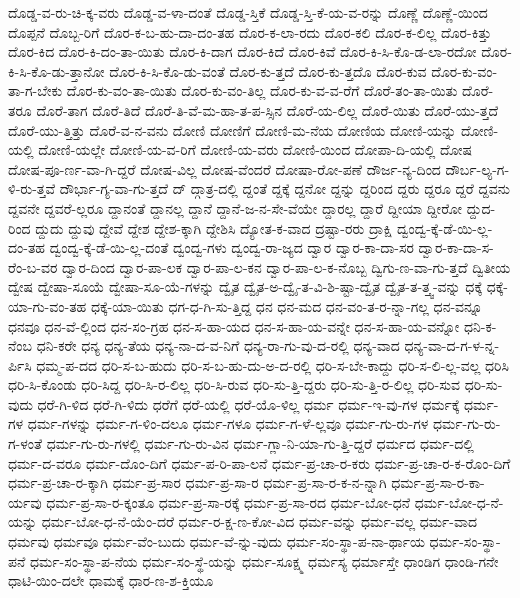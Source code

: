 {ದೊಡ್ಡ-ವ-ರು-ಚಿ-ಕ್ಕ-ವರು
ದೊಡ್ಡ-ವ-ಳಾ-ದಂತೆ
ದೊಡ್ಡ-ಸ್ತಿಕೆ
ದೊಡ್ಡ-ಸ್ತಿ-ಕೆ-ಯ-ವ-ರನ್ನು
ದೊಣ್ಣೆ
ದೊಣ್ಣೆ-ಯಿಂದ
ದೊಪ್ಪನೆ
ದೊಬ್ಬ-ರಿಗೆ
ದೊರ-ಕ-ಬ-ಹು-ದಾ-ದಂ-ತಹ
ದೊರ-ಕ-ಲಾ-ರದು
ದೊರ-ಕಲಿ
ದೊರ-ಕ-ಲಿಲ್ಲ
ದೊರ-ಕಿತ್ತು
ದೊರ-ಕಿದ
ದೊರ-ಕಿ-ದಂ-ತಾ-ಯಿತು
ದೊರ-ಕಿ-ದಾಗ
ದೊರ-ಕಿದೆ
ದೊರ-ಕಿವೆ
ದೊರ-ಕಿ-ಸಿ-ಕೊ-ಡ-ಲಾ-ರದೋ
ದೊರ-ಕಿ-ಸಿ-ಕೊ-ಡು-ತ್ತಾನೋ
ದೊರ-ಕಿ-ಸಿ-ಕೊ-ಡು-ವಂತೆ
ದೊರ-ಕು-ತ್ತದೆ
ದೊರ-ಕು-ತ್ತದೊ
ದೊರ-ಕುವ
ದೊರ-ಕು-ವಂ-ತಾ-ಗ-ಬೇಕು
ದೊರ-ಕು-ವಂ-ತಾ-ಯಿತು
ದೊರ-ಕು-ವಂ-ತಿಲ್ಲ
ದೊರ-ಕು-ವ-ವ-ರೆಗೆ
ದೊರೆ-ತಂ-ತಾ-ಯಿತು
ದೊರೆ-ತರೂ
ದೊರೆ-ತಾಗ
ದೊರೆ-ತಿದೆ
ದೊರೆ-ತಿ-ವೆ-ಮ-ಹಾ-ತ-ಪ-ಸ್ಸಿನ
ದೊರೆ-ಯ-ಲಿಲ್ಲ
ದೊರೆ-ಯಿತು
ದೊರೆ-ಯು-ತ್ತದೆ
ದೊರೆ-ಯು-ತ್ತಿತ್ತು
ದೊರೆ-ವ-ನ-ವನು
ದೋಣಿ
ದೋಣಿಗೆ
ದೋಣಿ-ಮ-ನೆಯ
ದೋಣಿಯ
ದೋಣಿ-ಯನ್ನು
ದೋಣಿ-ಯಲ್ಲಿ
ದೋಣಿ-ಯಲ್ಲೇ
ದೋಣಿ-ಯ-ವ-ರಿಗೆ
ದೋಣಿ-ಯ-ವರು
ದೋಣಿ-ಯಿಂದ
ದೋಪಾ-ದಿ-ಯಲ್ಲಿ
ದೋಷ
ದೋಷ-ಪೂ-ರ್ಣ-ವಾ-ಗಿ-ದ್ದರೆ
ದೋಷ-ವಿಲ್ಲ
ದೋಷ-ವೆಂದರೆ
ದೋಷಾ-ರೋ-ಪಣೆ
ದೌರ್ಜ-ನ್ಯ-ದಿಂದ
ದೌರ್ಬ-ಲ್ಯ-ಗ-ಳಿ-ರು-ತ್ತವೆ
ದೌರ್ಭಾ-ಗ್ಯ-ವಾ-ಗು-ತ್ತದೆ
ದ್
ದ್ಗಾತ್ರ-ದಲ್ಲಿ
ದ್ದಂತೆ
ದ್ದಕ್ಕೆ
ದ್ದನೋ
ದ್ದನ್ನು
ದ್ದರಿಂದ
ದ್ದರು
ದ್ದರೂ
ದ್ದರೆ
ದ್ದವನು
ದ್ದವನೇ
ದ್ದವರೆ-ಲ್ಲರೂ
ದ್ದಾನಂತೆ
ದ್ದಾನಲ್ಲ
ದ್ದಾನೆ
ದ್ದಾನೆ-ಜ-ನ-ಸೇ-ವೆಯೇ
ದ್ದಾರಲ್ಲ
ದ್ದಾರೆ
ದ್ದೀಯಾ
ದ್ದೀರೋ
ದ್ದುದ-ರಿಂದ
ದ್ದುದು
ದ್ದುವು
ದ್ದೇವೆ
ದ್ದೇಶ
ದ್ದೇಶ-ಕ್ಕಾಗಿ
ದ್ದೇಶಿಸಿ
ದ್ಯೋತ-ಕ-ವಾದ
ದ್ರಷ್ಟಾ-ರರು
ದ್ರಾಕ್ಷಿ
ದ್ವಂದ್ವ-ಕ್ಕೆ-ಡೆ-ಯಿ-ಲ್ಲ-ದಂ-ತಹ
ದ್ವಂದ್ವ-ಕ್ಕೆ-ಡೆ-ಯಿ-ಲ್ಲ-ದಂತೆ
ದ್ವಂದ್ವ-ಗಳು
ದ್ವಂದ್ವ-ರಾ-ಜ್ಯದ
ದ್ವಾರ
ದ್ವಾರ-ಕಾ-ದಾ-ಸರ
ದ್ವಾರ-ಕಾ-ದಾ-ಸ-ರೆಂ-ಬ-ವರ
ದ್ವಾರ-ದಿಂದ
ದ್ವಾರ-ಪಾ-ಲಕ
ದ್ವಾರ-ಪಾ-ಲ-ಕನ
ದ್ವಾರ-ಪಾ-ಲ-ಕ-ನೊಬ್ಬ
ದ್ವಿಗು-ಣ-ವಾ-ಗು-ತ್ತದೆ
ದ್ವಿತೀಯ
ದ್ವೇಷ
ದ್ವೇಷಾ-ಸೂಯೆ
ದ್ವೇಷಾ-ಸೂ-ಯೆ-ಗಳನ್ನು
ದ್ವೈತ
ದ್ವೈತ-ಅ-ದ್ವೈ-ತ-ವಿ-ಶಿ-ಷ್ಟಾ-ದ್ವೈತ
ದ್ವೈತ-ತ-ತ್ತ್ವ-ವನ್ನು
ಧಕ್ಕೆ
ಧಕ್ಕೆ-ಯಾ-ಗು-ವಂ-ತಹ
ಧಕ್ಕೆ-ಯಾ-ಯಿತು
ಧಗ-ಧ-ಗಿ-ಸು-ತ್ತಿದ್ದ
ಧನ
ಧನ-ಮದ
ಧನ-ವಂ-ತ-ರ-ನ್ನಾ-ಗಲ್ಲ
ಧನ-ವನ್ನೂ
ಧನವೂ
ಧನ-ವೆ-ಲ್ಲಿಂದ
ಧನ-ಸಂ-ಗ್ರಹ
ಧನ-ಸ-ಹಾ-ಯದ
ಧನ-ಸ-ಹಾ-ಯ-ವನ್ನೇ
ಧನ-ಸ-ಹಾ-ಯ-ವನ್ನೋ
ಧನಿ-ಕ-ನೆಂಬ
ಧನಿ-ಕರೇ
ಧನ್ಯ
ಧನ್ಯ-ತೆಯ
ಧನ್ಯ-ನಾ-ದ-ವ-ನಿಗೆ
ಧನ್ಯ-ರಾ-ಗು-ವು-ದ-ರಲ್ಲಿ
ಧನ್ಯ-ವಾದ
ಧನ್ಯ-ವಾ-ದ-ಗ-ಳ-ನ್ನ-ರ್ಪಿಸಿ
ಧಮ್ಮ-ಪ-ದದ
ಧರಿ-ಸ-ಬ-ಹುದು
ಧರಿ-ಸ-ಬ-ಹು-ದು-ಅ-ದ-ರಲ್ಲಿ
ಧರಿ-ಸ-ಬೇ-ಕಾದ್ದು
ಧರಿ-ಸ-ಲಿ-ಲ್ಲ-ವಲ್ಲ
ಧರಿಸಿ
ಧರಿ-ಸಿ-ಕೊಂಡು
ಧರಿ-ಸಿದ್ದ
ಧರಿ-ಸಿ-ರ-ಲಿಲ್ಲ
ಧರಿ-ಸಿ-ರುವ
ಧರಿ-ಸು-ತ್ತಿ-ದ್ದರು
ಧರಿ-ಸು-ತ್ತಿ-ರ-ಲಿಲ್ಲ
ಧರಿ-ಸುವ
ಧರಿ-ಸು-ವುದು
ಧರೆ-ಗಿ-ಳಿದ
ಧರೆ-ಗಿ-ಳಿದು
ಧರೆಗೆ
ಧರೆ-ಯಲ್ಲಿ
ಧರೆ-ಯೊ-ಳಿಲ್ಲ
ಧರ್ಮ
ಧರ್ಮ-ಇ-ವು-ಗಳ
ಧರ್ಮಕ್ಕೆ
ಧರ್ಮ-ಗಳ
ಧರ್ಮ-ಗಳನ್ನು
ಧರ್ಮ-ಗ-ಳಿಂ-ದಲೂ
ಧರ್ಮ-ಗಳೂ
ಧರ್ಮ-ಗ-ಳೆ-ಲ್ಲವೂ
ಧರ್ಮ-ಗು-ರು-ಗಳ
ಧರ್ಮ-ಗು-ರು-ಗ-ಳಂತೆ
ಧರ್ಮ-ಗು-ರು-ಗಳಲ್ಲಿ
ಧರ್ಮ-ಗು-ರು-ವಿನ
ಧರ್ಮ-ಗ್ಲಾ-ನಿ-ಯಾ-ಗು-ತ್ತಿ-ದ್ದರೆ
ಧರ್ಮದ
ಧರ್ಮ-ದಲ್ಲಿ
ಧರ್ಮ-ದ-ವರೂ
ಧರ್ಮ-ದೊಂ-ದಿಗೆ
ಧರ್ಮ-ಪ-ರಿ-ಪಾ-ಲನೆ
ಧರ್ಮ-ಪ್ರ-ಚಾ-ರ-ಕರು
ಧರ್ಮ-ಪ್ರ-ಚಾ-ರ-ಕ-ರೊಂ-ದಿಗೆ
ಧರ್ಮ-ಪ್ರ-ಚಾ-ರ-ಕ್ಕಾಗಿ
ಧರ್ಮ-ಪ್ರ-ಸಾರ
ಧರ್ಮ-ಪ್ರ-ಸಾ-ರ
ಧರ್ಮ-ಪ್ರ-ಸಾ-ರ-ಕ-ನ-ನ್ನಾಗಿ
ಧರ್ಮ-ಪ್ರ-ಸಾ-ರ-ಕಾ-ರ್ಯವು
ಧರ್ಮ-ಪ್ರ-ಸಾ-ರ-ಕ್ಕಂತೂ
ಧರ್ಮ-ಪ್ರ-ಸಾ-ರಕ್ಕೆ
ಧರ್ಮ-ಪ್ರ-ಸಾ-ರದ
ಧರ್ಮ-ಬೋ-ಧನೆ
ಧರ್ಮ-ಬೋ-ಧ-ನೆ-ಯನ್ನು
ಧರ್ಮ-ಬೋ-ಧ-ನೆ-ಯೆಂ-ದರೆ
ಧರ್ಮ-ರ-ಕ್ಷ-ಣ-ಕೋ-ವಿದ
ಧರ್ಮ-ವನ್ನು
ಧರ್ಮ-ವಲ್ಲ
ಧರ್ಮ-ವಾದ
ಧರ್ಮವು
ಧರ್ಮವೂ
ಧರ್ಮ-ವೆಂ-ಬುದು
ಧರ್ಮ-ವೆ-ನ್ನು-ವುದು
ಧರ್ಮ-ಸಂ-ಸ್ಥಾ-ಪ-ನಾ-ರ್ಥಾಯ
ಧರ್ಮ-ಸಂ-ಸ್ಥಾ-ಪನೆ
ಧರ್ಮ-ಸಂ-ಸ್ಥಾ-ಪ-ನೆಯ
ಧರ್ಮ-ಸಂ-ಸ್ಥೆ-ಯನ್ನು
ಧರ್ಮ-ಸೂಕ್ಷ್ಮ
ಧರ್ಮಸ್ಯ
ಧರ್ಮಾಸ್ತೇ
ಧಾಂಡಿಗ
ಧಾಂಡಿ-ಗನೇ
ಧಾಟಿ-ಯಿಂ-ದಲೇ
ಧಾಮಕ್ಕೆ
ಧಾರ-ಣ-ಶ-ಕ್ತಿಯೂ
}
